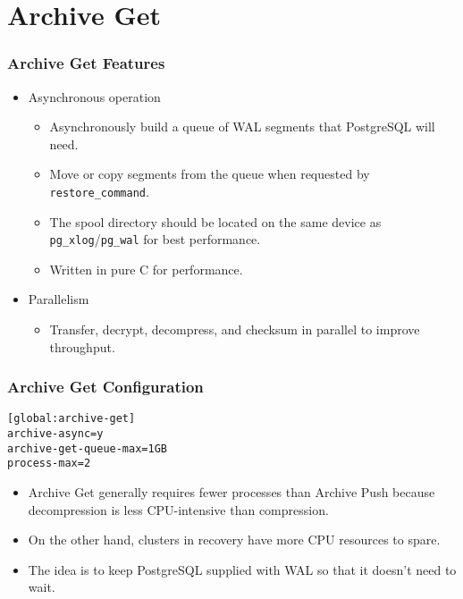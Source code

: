 \section{Archive Get}

\begin{frame}
    \frametitle{Archive Get Features}

    \begin{itemize}
        \item Asynchronous operation

        \begin{itemize}
            \item Asynchronously build a queue of WAL segments that PostgreSQL will need.\pause
            \item Move or copy segments from the queue when requested by \texttt{restore\_command}.\pause
            \item The spool directory should be located on the same device as \texttt{pg\_xlog}/\texttt{pg\_wal} for best performance.\pause
            \item Written in pure C for performance.\pause
        \end{itemize}

        \item Parallelism

        \begin{itemize}
            \item Transfer, decrypt, decompress, and checksum in parallel to improve throughput.
        \end{itemize}
    \end{itemize}
\end{frame}

\begin{frame}[fragile]
    \frametitle{Archive Get Configuration}

    \vspace{.75em}\begin{lstlisting}[title=pgbackrest.conf]
[global:archive-get]
archive-async=y
archive-get-queue-max=1GB
process-max=2
    \end{lstlisting}\pause\vspace{1em}

    \begin{itemize}
        \item Archive Get generally requires fewer processes than Archive Push because decompression is less CPU-intensive than compression.\pause
        \item On the other hand, clusters in recovery have more CPU resources to spare.\pause
        \item The idea is to keep PostgreSQL supplied with WAL so that it doesn't need to wait.
    \end{itemize}
\end{frame}

